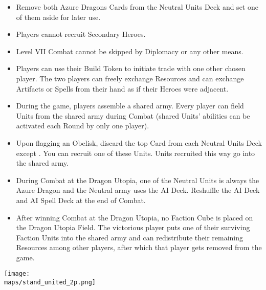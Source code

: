 \begin{multicols}{2}
\begin{itemize}
  \item Remove both Azure Dragons Cards from the  Neutral Units Deck and set one of them aside for later use.
  \item Players cannot recruit Secondary Heroes.
  \item Level VII Combat cannot be skipped by Diplomacy or any other means.
  \item Players can use their Build Token to initiate trade with one other chosen player. The two players can freely exchange Resources and can exchange Artifacts or Spells from their hand as if their Heroes were adjacent.
  \item During the game, players assemble a shared army. Every player can field Units from the shared army during Combat (shared Units'  abilities can be activated each Round by only one player).  %
  \item Upon flagging an Obelisk, discard the top Card from each Neutral Units Deck except . You can recruit one of these Units. Units recruited this way go into the shared army.
  \item During Combat at the Dragon Utopia, one of the Neutral  Units is always the Azure Dragon and the Neutral army uses the AI Deck. Reshuffle the AI Deck and AI Spell Deck at the end of Combat.
  \item After winning Combat at the Dragon Utopia, no Faction Cube is placed on the Dragon Utopia Field. The victorious player puts one of their surviving Faction Units into the shared army and can redistribute their remaining Resources among other players, after which that player gets removed from the game.
\end{itemize}

\columnbreak

\begin{center}
  \texttt{[image: \\maps/stand\_united\_2p.png]}
\end{center}

\vspace*{\fill}

\end{multicols}


